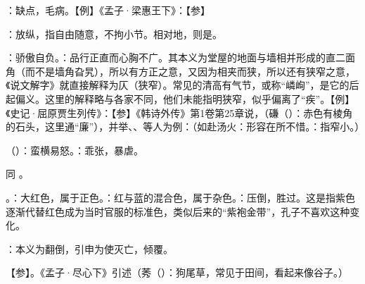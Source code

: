 {
\item {}：缺点，毛病。【例】《孟子·梁惠王下》：【参】
\item {}：放纵，指自由随意，不拘小节。相对地，则是。
\item {}：骄傲自负。：品行正直而心胸不广。其本义为堂屋的地面与墙相并形成的直二面角（而不是墙角旮旯），所以有方正之意，又因为相夹而狭，所以还有狭窄之意，《说文解字》就直接解释为仄（狭窄）。常见的清高有气节，或称“嶙峋”，是它的后起偏义。这里的解释略与各家不同，他们未能指明狭窄，似乎偏离了“疾”。【例】《史记·屈原贾生列传》：【参】《韩诗外传》第1卷第25章说，（磏（）：赤色有棱角的石头，这里通“廉”），并举、、等人为例：（如赴汤火：形容在所不惜。：指窄小。）

\item {}（）：蛮横易怒。：乖张，暴虐。
}
{}  %


{同 。}
{}


{
\item {}。：大红色，属于正色。：红与蓝的混合色，属于杂色。：压倒，胜过。这是指紫色逐渐代替红色成为当时官服的标准色，类似后来的“紫袍金带”，孔子不喜欢这种变化。
\item {}：本义为翻倒，引申为使灭亡，倾覆。

【参】。《孟子·尽心下》引述（莠（）：狗尾草，常见于田间，看起来像谷子。）
}
{}  %


